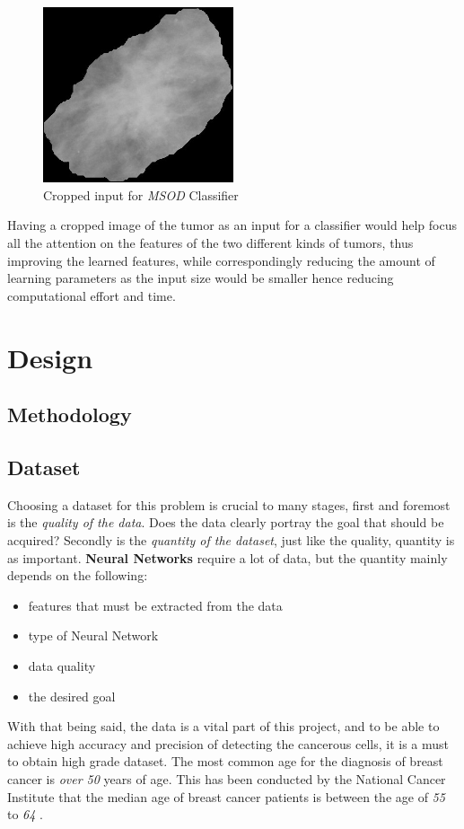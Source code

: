 \documentclass[12pt]{extarticle}
\begin{document}
	\begin{figure}[h]
		\centering
		\includegraphics[width=0.5\textwidth]{pics/Figures/cropped.jpg}
		\caption{\small{Cropped input for \emph{MSOD} Classifier}}
		\label{fig:cropped}
	\end{figure}
	Having a cropped image of the tumor as an input for a classifier would help focus all the attention on the features of the two different kinds of tumors, thus improving the learned features, while correspondingly reducing the amount of learning parameters as the input size would be smaller hence reducing computational effort and time. 
	
	\newpage
	\section{Design}
	
	
	
	\subsection{Methodology}
	
	\subsection{Dataset}\label{Data}
	Choosing a dataset for this problem is crucial to many stages, first and foremost is the \emph{quality of the data}. Does the data clearly portray the goal that should be acquired? Secondly is the \emph{quantity of the dataset}, just like the quality, quantity is as important. \textbf{Neural Networks} require a lot of data, but the quantity mainly depends on the following:
	\begin{itemize}
		\item features that must be extracted from the data
		\item type of Neural Network
		\item data quality
		\item the desired goal
	\end{itemize}
	With that being said, the data is a vital part of this project, and to be able to achieve high accuracy and precision of detecting the cancerous cells, it is a must to obtain high grade dataset. 
	The most common age for the diagnosis of breast cancer is \emph{over 50} years of age. This has been conducted by the National Cancer Institute that the median age of breast cancer patients is between the age of \emph{55} to \emph{64} \cite{CDC}. 
	\\[5mm]
\end{document}

